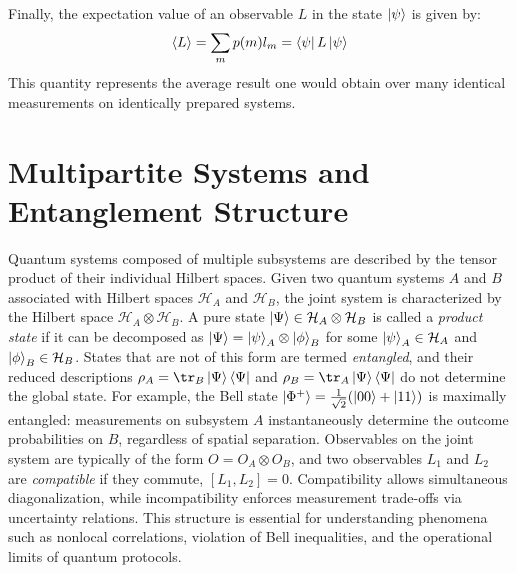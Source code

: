 Finally, the expectation value of an observable $L$ in the state $\ket{\psi}$ is given by:
\begin{equation}
    \langle L \rangle = \sum_m p(m) l_m = \bra{\psi} L \ket{\psi}
\end{equation}
This quantity represents the average result one would obtain over many identical measurements on identically prepared systems.
\section{Multipartite Systems and Entanglement Structure}
Quantum systems composed of multiple subsystems are described by the tensor product of their individual Hilbert spaces. Given two quantum systems $A$ and $B$ associated with Hilbert spaces $\mathcal{H}_A$ and $\mathcal{H}_B$, the joint system is characterized by the Hilbert space $\mathcal{H}_A \otimes \mathcal{H}_B$. A pure state $\ket{\Psi} \in \mathcal{H}_A \otimes \mathcal{H}_B$ is called a \emph{product state} if it can be decomposed as $\ket{\Psi} = \ket{\psi}_A \otimes \ket{\phi}_B$ for some $\ket{\psi}_A \in \mathcal{H}_A$ and $\ket{\phi}_B \in \mathcal{H}_B$. States that are not of this form are termed \emph{entangled}, and their reduced descriptions $\rho_A = \tr_B \ket{\Psi}\bra{\Psi}$ and $\rho_B = \tr_A \ket{\Psi}\bra{\Psi}$ do not determine the global state. For example, the Bell state $\ket{\Phi^+} = \frac{1}{\sqrt{2}}(\ket{00} + \ket{11})$ is maximally entangled: measurements on subsystem $A$ instantaneously determine the outcome probabilities on $B$, regardless of spatial separation. Observables on the joint system are typically of the form $O = O_A \otimes O_B$, and two observables $L_1$ and $L_2$ are \emph{compatible} if they commute, $[L_1, L_2] = 0$. Compatibility allows simultaneous diagonalization, while incompatibility enforces measurement trade-offs via uncertainty relations. This structure is essential for understanding phenomena such as nonlocal correlations, violation of Bell inequalities, and the operational limits of quantum protocols.

